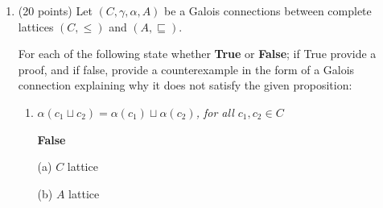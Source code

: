 \documentclass[12pt]{article}
\begin{document}
\begin{enumerate}
\begin{mdframed}
\end{mdframed}


\item  (20 points) 
Let $(C, \gamma, \alpha, A)$ be a Galois connections between complete lattices 
$(C, \leq)$ and $(A, \sqsubseteq)$.

For each of the following state whether \textbf{True} or \textbf{False}; 
if True provide a proof, and if false, provide a counterexample in the form 
of a Galois connection explaining why it does not satisfy the given proposition: 

\begin{enumerate}
  \item 
 \emph{$\alpha ( c_1 \sqcup c_2 ) = \alpha(c_1) \sqcup \alpha(c_2)$, for all $c_1, c_2 \in C$}
 \begin{mdframed}
  \textbf{False}

  \begin{minipage}{0.48\textwidth}
\centering

\vspace{0.5em}
(a) $C$ lattice 
\end{minipage}
\hfill
\begin{minipage}{0.48\textwidth}
\centering

\vspace{0.5em}
(b) $A$ lattice 
\end{minipage}


\end{mdframed}
\end{enumerate}
\end{enumerate}
\end{document}
